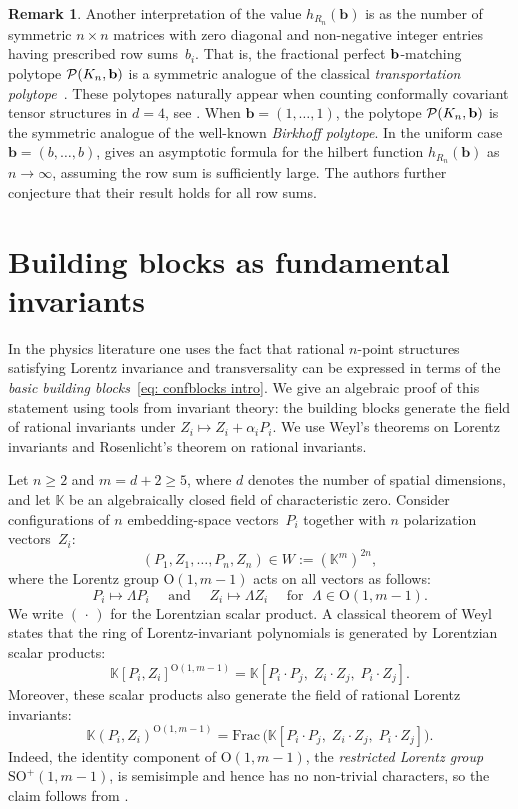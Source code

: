 \documentclass[12pt,a4paper]{extarticle}
\theoremstyle{definition}
\newtheorem{remark}[theorem]{Remark}
\newcommand{\K}{\mathbb{K}}
\begin{document}
\begin{remark}\label{rem: transportation polytope}
 Another interpretation of the value $ h_{R_n}(\mathbf{b}) $ is as the number of symmetric ${n\times n}$ matrices with zero diagonal and non-negative integer entries having prescribed row sums~$ b_i $. That is, the fractional perfect 
$\bf{b}$-matching polytope $\mathcal{P}(K_n, \bf{b})$  is a symmetric analogue of the classical \emph{transportation polytope}~\cite{BOLKER1972251}. These polytopes naturally appear when counting conformally covariant tensor structures in $d=4$, see \cite[Equation 15]{Heslop2026}. When $\mathbf{b} = (1,\dots,1)$, the polytope $\mathcal{P}(K_n, \bf{b})$ is the symmetric analogue of the well-known \emph{Birkhoff polytope}. In the uniform case $ \mathbf{b} = (b,\ldots,b) $, \cite[Theorem~1.1]{McKay2011ASYMPTOTICEO} gives an asymptotic formula for the hilbert function $ h_{R_n}(\mathbf{b}) $ as $ n \to \infty $, assuming the row sum is sufficiently large. The authors further conjecture that their result holds for all row sums.
\end{remark}

\section{Building blocks as fundamental invariants} \label{sec:unipotent}
In the physics literature \cite{DanielNathan,CT,CPPR,DKKPS,Zhiboedov} one uses the fact that rational
$n$-point structures satisfying Lorentz invariance and transversality can be
expressed in terms of the \emph{basic building blocks}~\eqref{eq: confblocks intro}. We give an
algebraic proof of this statement using tools from invariant theory:  the building blocks generate
the field of rational invariants under
$Z_i\mapsto Z_i+\alpha_iP_i$.  
We use Weyl's theorems on Lorentz
invariants and Rosenlicht's theorem on rational invariants.

\medskip
Let $n\geq 2$ and $m=d+2\geq 5$, where 
$d$ denotes the number of spatial dimensions, and let $\K$ be an algebraically closed field
of characteristic zero. Consider configurations of $n$ embedding-space vectors~$P_i$ together with $n$ polarization vectors~$Z_i$:
$$
    (P_1,Z_1,\ldots,P_n,Z_n)\in W:=(\K^m)^{2n},
$$
where the Lorentz group $\mathrm{O}(1,m-1)$ acts on all vectors as follows:
$$P_i \mapsto \Lambda P_i \quad \text{ and } \quad Z_i \mapsto \Lambda Z_i \quad \text{ for } \; \Lambda \in \mathrm{O}(1, m{-}1).$$ 
We
write $(\,\cdot\,)$ for the Lorentzian scalar product. A classical theorem of  Weyl~\cite[p.~65]{Weyl} states that the ring of
Lorentz-invariant polynomials is generated by Lorentzian scalar products:
$$
    \K[P_i,Z_i]^{\mathrm{O}(1,m-1)}
    =
    \K[P_i\cdot P_j,\;Z_i\cdot Z_j,\;P_i\cdot Z_j].
$$
Moreover, these scalar products also generate the field of rational Lorentz
invariants:
\begin{equation*}
 \K(P_i,Z_i)^{\mathrm{O}(1,m-1)}
    =
    \mathrm{Frac}\,
    \bigl(\K[P_i\cdot P_j,\;Z_i\cdot Z_j,\;P_i\cdot Z_j]\bigr).
\end{equation*}
Indeed, the identity component of $\mathrm{O}(1,m-1)$, the \emph{restricted Lorentz group} $\mathrm{SO}^+(1,m-1)$, is  semisimple
 and hence has no non‑trivial characters, so the claim follows from \cite[Lemma~2.2]{CollSans}.
\end{document}
